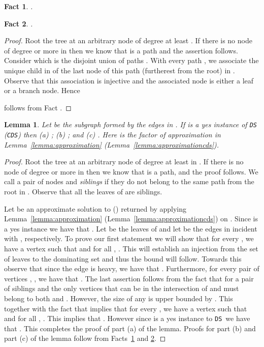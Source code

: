 \documentclass[11pt]{article}
\newtheorem{lemma}{Lemma}
\newtheorem{fact}{Fact}
\newcommand{\tDS}{{\texttt{\sc DS}}}
\newcommand{\tCDS}{{\texttt{\sc CDS}}}
\begin{document}
\begin{fact}
\label{fact:simplecounta}
 .
\end{fact}


\begin{fact}
\label{fact:simplecountb}
 .
\end{fact}
\begin{proof}
Root the tree at an arbitrary node of degree at least . If there is no node of degree  or more in  
then we know that  is a path  and the assertion follows. Consider  which is the disjoint union of paths
. With every path , we
associate the unique child in  of the last node of this path (furtherest from the root)  in
. Observe that this association is injective and the associated
node is either a leaf or a branch node. Hence 

follows from Fact .
\end{proof}

\begin{lemma}
\label{lemma:boundingleavesandpaths}
Let  be the subgraph formed by the edges in . 
If  is a yes instance of \tDS \, (\tCDS) then (a) ;  
(b) ; and 
(c)  .  
Here  is the factor of approximation in Lemma~\ref{lemma:approximation} (Lemma~\ref{lemma:approximationcds}). 
\end{lemma}
\begin{proof}
Root the tree at an arbitrary node  of degree at least  in . If there is no node of degree  
or more in  then we know that   is a path,  and the proof follows. 
We call a pair of nodes  and  {\em siblings} if they do not 
belong to the same path from the root  in . Observe that all the leaves of  are siblings. 

 Let  be an approximate solution to  () returned by applying Lemma~\ref{lemma:approximation} (Lemma~\ref{lemma:approximationcds}) on . Since   is a yes instance we have that . 
Let  be the leaves of  and let  be the  edges in  incident 
with   , respectively.  To prove our first statement we will show that for every , we have a vertex 
   such that  and for  all , . This will establish an 
 injection from the set of leaves to the dominating set  and thus the bound will follow. Towards this observe that 
 since the edge  is heavy,  we have that .  
Furthermore, for every pair of 
 vertices , , we have that 
 . The last assertion  follows from the fact that for a pair of siblings  and  
  the only vertices that  can be in the intersection of   and  must belong to both  and 
  . However, the size of any  is upper bounded by . This together with the fact that 
   implies that for every , we have a vertex   such that 
  and for  all , .  This implies that . However since  is a yes instance to \tDS \, we have that . This completes the proof of part (a)  of the lemma. 
Proofs for part (b) and part (c) of the lemma follow from Facts~\ref{fact:simplecounta} and \ref{fact:simplecountb}. 
\end{proof}
\end{document}
